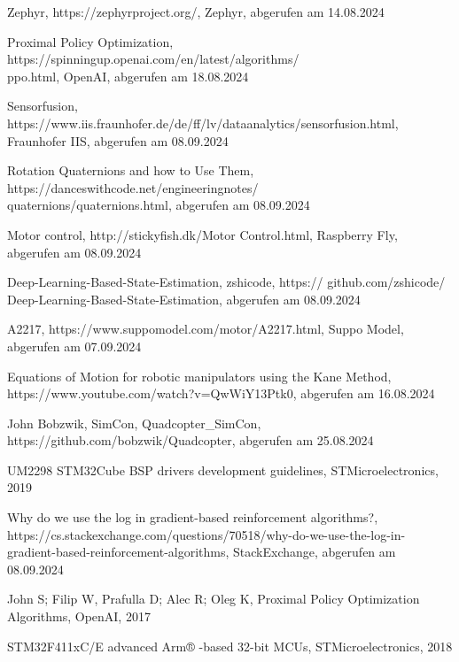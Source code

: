 \begin{enumerate}[label=\textbf{[\arabic*]}]
	\item \label{link:Zephyr}Zephyr, https://zephyrproject.org/, Zephyr, abgerufen am 14.08.2024
	\item \label{link:PPOSpinningUp}Proximal Policy Optimization, https://spinningup.openai.com/en/latest/algorithms/\\ppo.html, OpenAI, abgerufen am 18.08.2024
	\item \label{link:Sensorfusion}Sensorfusion, https://www.iis.fraunhofer.de/de/ff/lv/dataanalytics/sensorfusion.html,\\
	Fraunhofer IIS, abgerufen am 08.09.2024
	\item \label{link:Quaternion}Rotation Quaternions and how to Use Them, https://danceswithcode.net/engineeringnotes/\\
	quaternions/quaternions.html, abgerufen am 08.09.2024
	\item \label{link:MotorControl}Motor control, http://stickyfish.dk/Motor Control.html, Raspberry Fly, abgerufen am 08.09.2024
	\item \label{link:DeepLearningStateEstimation}Deep-Learning-Based-State-Estimation, zshicode, https://
	github.com/zshicode/\\Deep-Learning-Based-State-Estimation, abgerufen am 08.09.2024
	\item \label{link:A2217}A2217, https://www.suppomodel.com/motor/A2217.html, Suppo Model, abgerufen am 07.09.2024
	\item \label{link:Kane}Equations of Motion for robotic manipulators using the Kane Method,\\
	https://www.youtube.com/watch?v=QwWiY13Ptk0, abgerufen am 16.08.2024
	\item \label{link:SimCon}John Bobzwik, SimCon, Quadcopter\_SimCon, https://github.com/bobzwik/Quadcopter, abgerufen am 25.08.2024
	\item \label{link:STM32CubeBSP} UM2298 STM32Cube BSP drivers development guidelines, STMicroelectronics, 2019
	\item \label{link:31} Why do we use the log in gradient-based reinforcement algorithms?,\\
	https://cs.stackexchange.com/questions/70518/why-do-we-use-the-log-in-gradient-based-reinforcement-algorithms, StackExchange, abgerufen am 08.09.2024
	\item \label{link:32} John S; Filip W, Prafulla D; Alec R; Oleg K, Proximal Policy Optimization Algorithms, OpenAI, 2017
	\item \label{link:33} STM32F411xC/E advanced Arm® -based 32-bit MCUs, STMicroelectronics, 2018

\end{enumerate}
